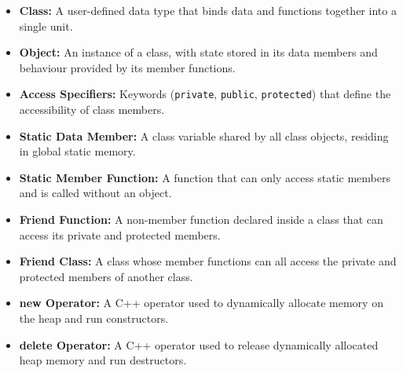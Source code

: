 \documentclass[12pt,a4paper]{article}
\begin{document}
\begin{tcolorbox}[defbox, title={\textbf{One-Line Definitions}}]
\begin{itemize}[leftmargin=*, itemsep=2.5pt, topsep=0pt]
  \item \textbf{Class:} A user-defined data type that binds data and functions together into a single unit.
  \item \textbf{Object:} An instance of a class, with state stored in its data members and behaviour provided by its member functions.
  \item \textbf{Access Specifiers:} Keywords (\texttt{private}, \texttt{public}, \texttt{protected}) that define the accessibility of class members.
  \item \textbf{Static Data Member:} A class variable shared by all class objects, residing in global static memory.
  \item \textbf{Static Member Function:} A function that can only access static members and is called without an object.
  \item \textbf{Friend Function:} A non-member function declared inside a class that can access its private and protected members.
  \item \textbf{Friend Class:} A class whose member functions can all access the private and protected members of another class.
  \item \textbf{new Operator:} A C++ operator used to dynamically allocate memory on the heap and run constructors.
  \item \textbf{delete Operator:} A C++ operator used to release dynamically allocated heap memory and run destructors.
\end{itemize}
\end{tcolorbox}
\end{document}

